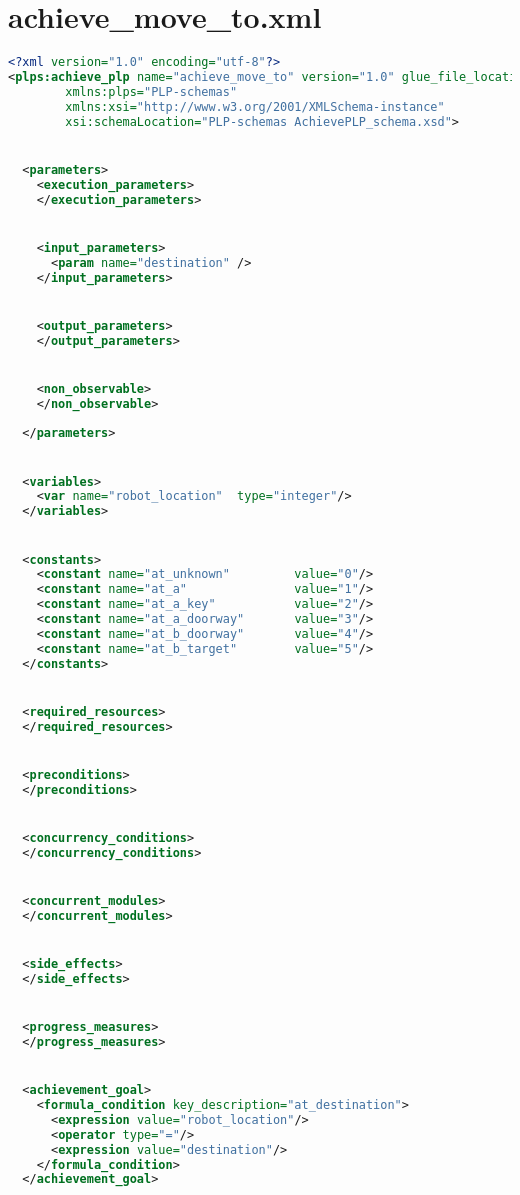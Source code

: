 \section{  achieve_move_to.xml}\label{Appendix_3_6} 
\begin{lstlisting}[style=stylexml,language=XML]
<?xml version="1.0" encoding="utf-8"?>
<plps:achieve_plp name="achieve_move_to" version="1.0" glue_file_location=""
        xmlns:plps="PLP-schemas"
        xmlns:xsi="http://www.w3.org/2001/XMLSchema-instance"
        xsi:schemaLocation="PLP-schemas AchievePLP_schema.xsd">


  <parameters>
    <execution_parameters>
    </execution_parameters>


    <input_parameters>
      <param name="destination" />
    </input_parameters>


    <output_parameters>
    </output_parameters>


    <non_observable>
    </non_observable>
    
  </parameters>


  <variables>
    <var name="robot_location"  type="integer"/>
  </variables>


  <constants>
    <constant name="at_unknown"         value="0"/>
    <constant name="at_a"               value="1"/>
    <constant name="at_a_key"           value="2"/>
    <constant name="at_a_doorway"       value="3"/>
    <constant name="at_b_doorway"       value="4"/>
    <constant name="at_b_target"        value="5"/>
  </constants>


  <required_resources>
  </required_resources>


  <preconditions>
  </preconditions>


  <concurrency_conditions>
  </concurrency_conditions>


  <concurrent_modules>
  </concurrent_modules>


  <side_effects>
  </side_effects>


  <progress_measures>
  </progress_measures>


  <achievement_goal>
    <formula_condition key_description="at_destination">
      <expression value="robot_location"/>
      <operator type="="/>
      <expression value="destination"/>
    </formula_condition>
  </achievement_goal>



\end{lstlisting}
